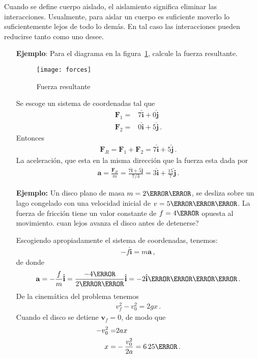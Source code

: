 \begin{borrar}
Cuando se define cuerpo aislado, el aislamiento significa eliminar las interacciones. Usualmente, para aislar un cuerpo es suficiente moverlo lo suficientemente lejos de todo lo dem\'as. En tal caso las interacciones pueden reducirse tanto como uno desee.
  
\end{borrar}


\begin{itemize}
\item[\textbf{Ejemplo}:] Para el diagrama en la figura~\ref{fig:forces}, calcule la fuerza resultante.
  \begin{figure}
    \centering
    \texttt{[image: forces]}
    \caption{Fuerza resultante}
    \label{fig:forces}
  \end{figure}

Se escoge un sistema de coordenadas tal que
\begin{align}
  \mathbf{F}_1=&7\hat{\mathbf{i}}+0\hat{\mathbf{j}}\nonumber\\
  \mathbf{F}_2=&0\hat{\mathbf{i}}+5\hat{\mathbf{j}}\,.
\end{align}
Entonces
\begin{align}
  \mathbf{F}_R=\mathbf{F}_1+\mathbf{F}_2=
  7\hat{\mathbf{i}}+5\hat{\mathbf{j}}\,.
\end{align}
La aceleraci\'on, que esta en la misma direcci\'on que la fuerza esta dada por
\begin{align}
  \mathbf{a}=\frac{\mathbf{F}_R}{m}=\frac{7\hat{\mathbf{i}}+5\hat{\mathbf{j}}}{7/3}=3\hat{\mathbf{i}}+\frac{15}{7}\hat{\mathbf{j}}\,.
\end{align}

\item[\textbf{Ejemplo:}] Un disco plano de masa $m=2\kilo\gram$, se desliza sobre un lago congelado con una velocidad inicial de $v=5\meter\per\second$. La fuerza de fricci\'on tiene un valor constante de $f=4\newton$ opuesta al movimiento. \textquestiondown cuan lejos avanza el disco antes de detenerse?

Escogiendo apropiadamente el sistema de coordenadas, tenemos:
\begin{align}
  -f \hat{\mathbf{i}}=m\mathbf{a}\,,
\end{align}
de donde
\begin{align}
  \mathbf{a}=-\frac{f}{m}\hat{\mathbf{i}}=\frac{-4\newton}{2\kilo\gram}\hat{\mathbf{i}}=\unit{-2\hat{\mathbf{i}}}{\meter\per\second\squared}\,.
\end{align}
De la cinem\'atica del problema tenemos
\begin{align}
  v_f^2-v_0^2=2 g x\,.
\end{align}
Cuando el disco se detiene $\mathbf{v}_f=0$, de modo que
\begin{align}
  -v_0^2=&2ax\nonumber\\
  x=&-\frac{v_0^2}{2a}=\unit{6.25}{\meter}\,.
\end{align}


\end{itemize}

